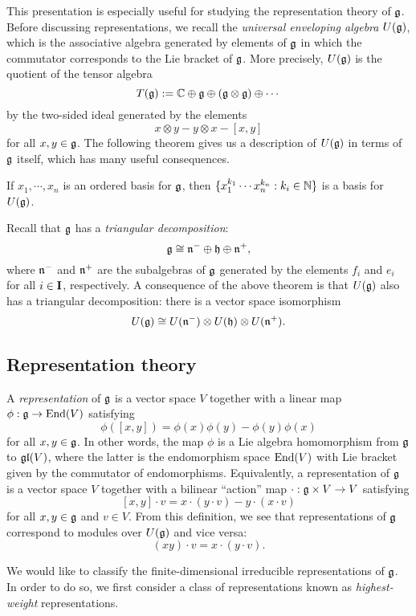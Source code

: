 This presentation is especially useful for studying the representation theory of $\mathfrak{g}$.
Before discussing representations, we recall the \emph{universal enveloping algebra} $U(\mathfrak{g})$, which is the associative algebra generated by elements of $\mathfrak{g}$ in which the commutator corresponds to the Lie bracket of $\mathfrak{g}$.
More precisely, $U(\mathfrak{g})$ is the quotient of the tensor algebra
\[T(\mathfrak{g}) := \mathbb{C} \oplus \mathfrak{g} \oplus (\mathfrak{g}\otimes\mathfrak{g}) \oplus \cdots\]
by the two-sided ideal generated by the elements
\[x\otimes y - y\otimes x - [x,y]\]
for all $x,y\in\mathfrak{g}$.
The following theorem gives us a description of $U(\mathfrak{g})$ in terms of $\mathfrak{g}$ itself, which has many useful consequences.

\begin{theorem}\label{T:PBW-g}
    If $x_1,\cdots,x_n$ is an ordered basis for $\mathfrak{g}$, then $\{x_1^{k_1}\cdots x_n^{k_n} : k_i\in\mathbb{N}\}$ is a basis for $U(\mathfrak{g})$.
\end{theorem}

Recall that $\mathfrak{g}$ has a \emph{triangular decomposition}:
\[\mathfrak{g} \cong \mathfrak{n}^-\oplus\mathfrak{h}\oplus\mathfrak{n}^+,\]
where $\mathfrak{n}^-$ and $\mathfrak{n}^+$ are the subalgebras of $\mathfrak{g}$ generated by the elements $f_i$ and $e_i$ for all $i\in\mathbf{I}$, respectively.
A consequence of the above theorem is that $U(\mathfrak{g})$ also has a triangular decomposition: there is a vector space isomorphism
\[U(\mathfrak{g}) \cong U(\mathfrak{n}^-)\otimes U(\mathfrak{h}) \otimes U(\mathfrak{n}^+).\]


\subsection{Representation theory}

A \emph{representation} of $\mathfrak{g}$ is a vector space $V$ together with a linear map $\phi:\mathfrak{g}\to\operatorname{End}(V)$ satisfying
\[\phi([x,y]) = \phi(x)\phi(y)-\phi(y)\phi(x)\]
for all $x,y\in\mathfrak{g}$.
In other words, the map $\phi$ is a Lie algebra homomorphism from $\mathfrak{g}$ to $\mathfrak{gl}(V)$, where the latter is the endomorphism space $\operatorname{End}(V)$ with Lie bracket given by the commutator of endomorphisms.
Equivalently, a representation of $\mathfrak{g}$ is a vector space $V$ together with a bilinear ``action'' map $\cdot:\mathfrak{g}\times V\to V$ satisfying
\[[x,y]\cdot v = x\cdot(y\cdot v) - y\cdot(x\cdot v)\]
for all $x,y\in\mathfrak{g}$ and $v\in V$.
From this definition, we see that representations of $\mathfrak{g}$ correspond to modules over $U(\mathfrak{g})$ and vice versa:
\[(xy)\cdot v = x\cdot (y\cdot v).\]

We would like to classify the finite-dimensional irreducible representations of $\mathfrak{g}$.
In order to do so, we first consider a class of representations known as \emph{highest-weight} representations.


